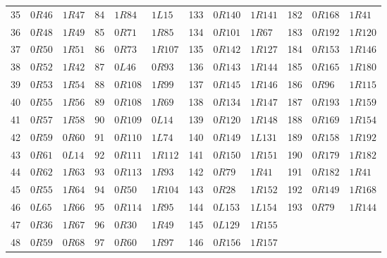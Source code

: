 \begin{longtable}{@{}rll@{\quad}rll@{\quad}rll@{\quad}rll@{}}
35 & $0R46$ & $1R47$ & 84 & $1R84$ & $1L15$ & 133 & $0R140$ & $1R141$ & 182 & $0R168$ & $1R41$ \\
36 & $0R48$ & $1R49$ & 85 & $0R71$ & $1R85$ & 134 & $0R101$ & $1R67$ & 183 & $0R192$ & $1R120$ \\
37 & $0R50$ & $1R51$ & 86 & $0R73$ & $1R107$ & 135 & $0R142$ & $1R127$ & 184 & $0R153$ & $1R146$ \\
38 & $0R52$ & $1R42$ & 87 & $0L46$ & $0R93$ & 136 & $0R143$ & $1R144$ & 185 & $0R165$ & $1R180$ \\
39 & $0R53$ & $1R54$ & 88 & $0R108$ & $1R99$ & 137 & $0R145$ & $1R146$ & 186 & $0R96$ & $1R115$ \\
40 & $0R55$ & $1R56$ & 89 & $0R108$ & $1R69$ & 138 & $0R134$ & $1R147$ & 187 & $0R193$ & $1R159$ \\
41 & $0R57$ & $1R58$ & 90 & $0R109$ & $0L14$ & 139 & $0R120$ & $1R148$ & 188 & $0R169$ & $1R154$ \\
42 & $0R59$ & $0R60$ & 91 & $0R110$ & $1L74$ & 140 & $0R149$ & $1L131$ & 189 & $0R158$ & $1R192$ \\
43 & $0R61$ & $0L14$ & 92 & $0R111$ & $1R112$ & 141 & $0R150$ & $1R151$ & 190 & $0R179$ & $1R182$ \\
44 & $0R62$ & $1R63$ & 93 & $0R113$ & $1R93$ & 142 & $0R79$ & $1R41$ & 191 & $0R182$ & $1R41$ \\
45 & $0R55$ & $1R64$ & 94 & $0R50$ & $1R104$ & 143 & $0R28$ & $1R152$ & 192 & $0R149$ & $1R168$ \\
46 & $0L65$ & $1R66$ & 95 & $0R114$ & $1R95$ & 144 & $0L153$ & $1L154$ & 193 & $0R79$ & $1R144$ \\
47 & $0R36$ & $1R67$ & 96 & $0R30$ & $1R49$ & 145 & $0L129$ & $1R155$ &  &  &  \\
48 & $0R59$ & $0R68$ & 97 & $0R60$ & $1R97$ & 146 & $0R156$ & $1R157$ &  &  &  \\
\end{longtable}
\endgroup
